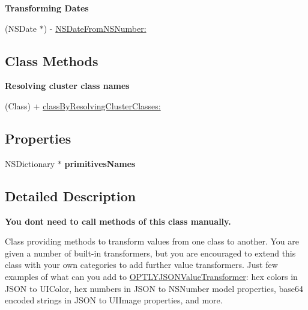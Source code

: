 \begin{Indent}\textbf{ Transforming Dates}\par
\begin{DoxyCompactItemize}
\item 
(N\+S\+Date $\ast$) -\/ \mbox{\hyperlink{interface_o_p_t_l_y_j_s_o_n_value_transformer_a3b249f39cbcf415c207881ada5d55708}{N\+S\+Date\+From\+N\+S\+Number\+:}}
\end{DoxyCompactItemize}
\end{Indent}
\subsection*{Class Methods}
\begin{Indent}\textbf{ Resolving cluster class names}\par
\begin{DoxyCompactItemize}
\item 
(Class) + \mbox{\hyperlink{interface_o_p_t_l_y_j_s_o_n_value_transformer_affd96dfa59aa1a30e649c7bab538f2f7}{class\+By\+Resolving\+Cluster\+Classes\+:}}
\end{DoxyCompactItemize}
\end{Indent}
\subsection*{Properties}
\begin{DoxyCompactItemize}
\item 
\mbox{\label{interface_o_p_t_l_y_j_s_o_n_value_transformer_a6238ec8ce84a770e2976cb8ed40582ce}} 
N\+S\+Dictionary $\ast$ {\bfseries primitives\+Names}
\end{DoxyCompactItemize}


\subsection{Detailed Description}
{\bfseries You don\textquotesingle{}t need to call methods of this class manually.}

Class providing methods to transform values from one class to another. You are given a number of built-\/in transformers, but you are encouraged to extend this class with your own categories to add further value transformers. Just few examples of what can you add to \mbox{\hyperlink{interface_o_p_t_l_y_j_s_o_n_value_transformer}{O\+P\+T\+L\+Y\+J\+S\+O\+N\+Value\+Transformer}}\+: hex colors in J\+S\+ON to U\+I\+Color, hex numbers in J\+S\+ON to N\+S\+Number model properties, base64 encoded strings in J\+S\+ON to U\+I\+Image properties, and more.

